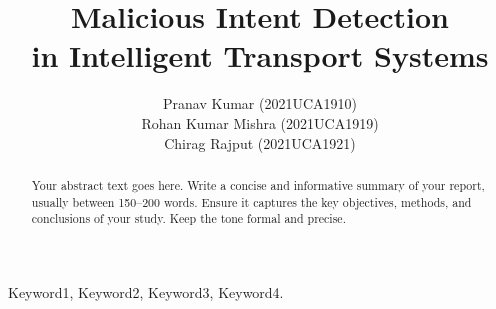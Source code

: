 \documentclass[11pt]{IEEEphot}
\begin{document}
\title{Malicious Intent Detection\\ in Intelligent Transport Systems}

\author{Pranav Kumar    (2021UCA1910)\\ Rohan Kumar Mishra  (2021UCA1919)\\
Chirag Rajput   (2021UCA1921)}


\maketitle
{}

\begin{abstract}
Your abstract text goes here. Write a concise and informative summary of your report, usually between 150–200 words. Ensure it captures the key objectives, methods, and conclusions of your study. Keep the tone formal and precise.
\end{abstract}

\begin{IEEEkeywords}
Keyword1, Keyword2, Keyword3, Keyword4.
\end{IEEEkeywords}

\end{document}
